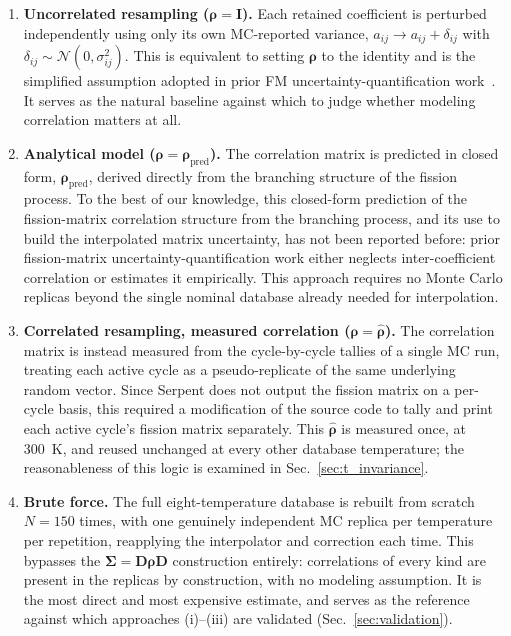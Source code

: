 \documentclass{style/nseJournal}
\begin{document}
\begin{enumerate}
  \item[(i)] \textbf{Uncorrelated resampling ($\boldsymbol\rho=\mathbf{I}$).} Each retained coefficient is perturbed independently using only its own MC-reported variance, $a_{ij}\to a_{ij}+\delta_{ij}$ with $\delta_{ij}\sim\mathcal{N}(0,\sigma_{ij}^2)$. This is equivalent to setting $\boldsymbol\rho$ to the identity and is the simplified assumption adopted in prior FM uncertainty-quantification work~\cite{HeWaltersNSE2022}. It serves as the natural baseline against which to judge whether modeling correlation matters at all.

\item[(ii)] \textbf{Analytical model ($\boldsymbol\rho=\boldsymbol\rho_{\text{pred}}$).} The correlation matrix is predicted in closed form, $\boldsymbol\rho_{\text{pred}}$, derived directly from the branching structure of the fission process. To the best of our knowledge, this closed-form prediction of the fission-matrix correlation structure from the branching process, and its use to build the interpolated matrix uncertainty, has not been reported before: prior fission-matrix uncertainty-quantification work either neglects inter-coefficient correlation or estimates it empirically. This approach requires no Monte Carlo replicas beyond the single nominal database already needed for interpolation.

  \item[(iii)] \textbf{Correlated resampling, measured correlation ($\boldsymbol\rho=\hat{\boldsymbol\rho}$).} The correlation matrix is instead measured from the cycle-by-cycle tallies of a single MC run, treating each active cycle as a pseudo-replicate of the same underlying random vector. Since Serpent does not output the fission matrix on a per-cycle basis, this required a modification of the source code to tally and print each active cycle's fission matrix separately.
  This $\hat{\boldsymbol\rho}$ is measured once, at 300~K, and reused unchanged at every other database temperature; the reasonableness of this logic is examined in Sec.~\ref{sec:t_invariance}.

  \item[(iv)] \textbf{Brute force.} The full eight-temperature database is rebuilt from scratch $N=150$ times, with one genuinely independent MC replica per temperature per repetition, reapplying the interpolator and correction each time. This bypasses the $\boldsymbol\Sigma=\mathbf{D}\boldsymbol\rho\mathbf{D}$ construction entirely: correlations of every kind are present in the replicas by construction, with no modeling assumption. It is the most direct and most expensive estimate, and serves as the reference against which approaches (i)--(iii) are validated (Sec.~\ref{sec:validation}).
\end{enumerate}
\end{document}

